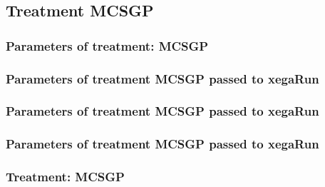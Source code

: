 \documentclass[18pt,c]{beamer}
\makeatletter
\def\beamer@writeslidentry@miniframesoff{%
  \expandafter\beamer@ifempty\expandafter{\beamer@framestartpage}{}%
  {%
   \clearpage\beamer@notesactions%
  }
}
\newcommand*{\miniframesoff}{\let\beamer@writeslidentry=\beamer@writeslidentry@miniframesoff}
\makeatother
\begin{document}
\miniframesoff
\subsection{Treatment MCSGP}

 \begin{frame}
 \fontsize{8pt}{9pt}\selectfont
 \frametitle{  Parameters of treatment: MCSGP 
 }

 \label{ExpAtParmTable004.tex}  
 \end{frame}


 \begin{frame}
 \fontsize{8pt}{9pt}\selectfont
 \frametitle{  Parameters of treatment MCSGP passed to xegaRun
 }

 \label{ExpAtParmTable005.tex}  
 \end{frame}


 \begin{frame}
 \fontsize{8pt}{9pt}\selectfont
 \frametitle{  Parameters of treatment MCSGP passed to xegaRun
 }

 \label{ExpAtParmTable006.tex}  
 \end{frame}


 \begin{frame}
 \fontsize{8pt}{9pt}\selectfont
 \frametitle{  Parameters of treatment MCSGP passed to xegaRun
 }

 \label{ExpAtParmTable007.tex}  
 \end{frame}

 \begin{frame}
 \fontsize{8pt}{9pt}\selectfont
 \frametitle{ Treatment: MCSGP }

 \label{ExpAStatsTable016.tex}  
 \end{frame}
\end{document}
